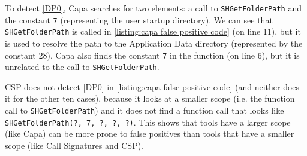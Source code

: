 To detect \autoref{DP0}, Capa searches for two elements: a call to \texttt{SHGetFolderPath} and the constant \texttt{7} (representing the user startup directory). We can see that \texttt{SHGetFolderPath} is called in \autoref{listing:capa false positive code} (on line 11), but it is used to resolve the path to the Application Data directory (represented by the constant 28). Capa also finds the constant \texttt{7} in the function (on line 6), but it is unrelated to the call to \texttt{SHGetFolderPath}.

\medskip

CSP does not detect \autoref{DP0} in \autoref{listing:capa false positive code} (and neither does it for the other ten cases), because it looks at a smaller scope (i.e. the function call to \texttt{SHGetFolderPath}) and it does not find a function call that looks like \texttt{SHGetFolderPath(?, 7, ?, ?, ?)}. This shows that tools have a larger scope (like Capa) can be more prone to false positives than tools that have a smaller scope (like Call Signatures and CSP).
